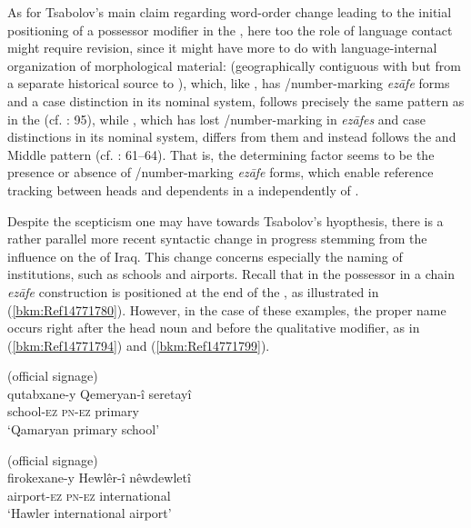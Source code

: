 \documentclass[output=paper]{langsci/langscibook}
\begin{document}
As for Tsabolov’s main claim regarding word-order change leading to the initial positioning of a possessor modifier in the , here too the role of language contact might require revision, since it might have more to do with language-internal organization of morphological material:  (geographically contiguous with  but from a separate historical source to ), which, like , has /number-marking \textit{ezāfe} forms and a case distinction in its nominal system, follows precisely the same  pattern as  in the  (cf. \citealt{Todd2002}: 95), while , which has lost /number-marking in \textit{ezāfes} and case distinctions in its nominal system, differs from them and instead follows the  and Middle  pattern (cf. \citealt{Öpengin2016}: 61–64). That is, the determining factor seems to be the presence or absence of /number-marking \textit{ezāfe} forms, which enable reference tracking between heads and dependents in a  independently of .   

Despite the scepticism one may have towards Tsabolov’s hyopthesis, there is a rather parallel more recent syntactic change in progress stemming from the  influence on the  of Iraq. This change concerns especially the naming of institutions, such as schools and airports. Recall that in   the possessor in a chain \textit{ezāfe} construction is positioned at the end of the , as illustrated in (\ref{bkm:Ref14771780}). However, in the case of these examples, the proper name occurs right after the head noun and before the qualitative modifier, as in (\ref{bkm:Ref14771794}) and (\ref{bkm:Ref14771799}). 

\ea\label{bkm:Ref14771794}  (official signage)\\
\gll qutabxane-y Qemeryan-î seretayî\\
     school-\textsc{ez} \textsc{pn-ez} primary\\
\glt ‘Qamaryan primary school’
\z

\ea\label{bkm:Ref14771799}  (official signage)\\
\gll firokexane-y Hewlêr-î nêwdewletî\\
     airport-\textsc{ez} \textsc{pn-ez} international\\
\glt ‘Hawler international airport’
\z
\end{document}
